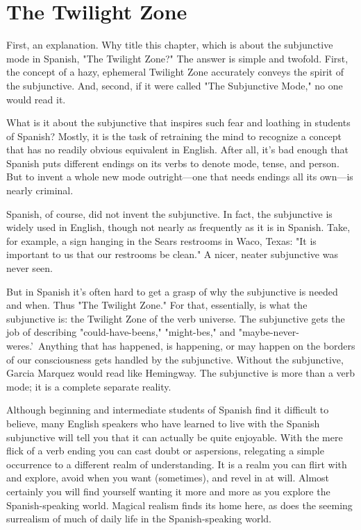 \documentclass[14pt,a4paper,oneside]{memoir}
\begin{document}
\chapter{The Twilight Zone}

First, an explanation. Why title this chapter, which is about
the subjunctive mode in Spanish, "The Twilight Zone?" The answer is
simple and twofold. First, the concept of a hazy, ephemeral Twilight
Zone accurately conveys the spirit of the subjunctive. And, second, if
it were called "The Subjunctive Mode," no one would read it.

What is it about the subjunctive that inspires such fear and
loathing in students of Spanish? Mostly, it is the task of retraining the
mind to recognize a concept that has no readily obvious equivalent in
English. After all, it's bad enough that Spanish puts different endings
on its verbs to denote mode, tense, and person. But to invent a whole
new mode outright---one that needs endings all its own---is nearly
criminal.

Spanish, of course, did not invent the subjunctive. In fact, the
subjunctive is widely used in English, though not nearly as frequently
as it is in Spanish. Take, for example, a sign hanging in the Sears restrooms in Waco, Texas: "It is important to us that our restrooms be
clean." A nicer, neater subjunctive was never seen.

But in Spanish it's often hard to get a grasp of why the subjunctive is needed and when. Thus "The Twilight Zone." For that, essentially, is what the subjunctive is: the Twilight Zone of the verb universe. The subjunctive gets the job of describing "could-have-beens,"
"might-bes," and "maybe-never-weres.'~Anything that has happened,
is happening, or may happen on the borders of our consciousness gets
handled by the subjunctive. Without the subjunctive, Garcia Marquez
would read like Hemingway. The subjunctive is more than a verb
mode; it is a complete separate reality.

Although beginning and intermediate students of Spanish find
it difficult to believe, many English speakers who have learned to live
with the Spanish subjunctive will tell you that it can actually be quite
enjoyable. With the mere flick of a verb ending you can cast doubt or
aspersions, relegating a simple occurrence to a different realm of understanding. It is a realm you can flirt with and explore, avoid when
you want (sometimes), and revel in at will. Almost certainly you will
find yourself wanting it more and more as you explore the Spanish-speaking world. Magical realism finds its home here, as does the seeming surrealism of much of daily life in the Spanish-speaking world.
\end{document}
